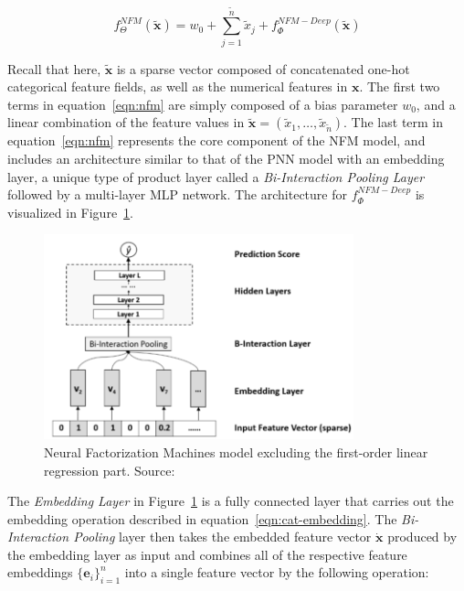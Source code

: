 \documentclass{mldsmsc}
\begin{document}
\begin{equation}
    \label{eqn:nfm}
    f_{\Theta}^{NFM}(\tilde{\mathbf{x}}) = w_0 + \sum_{j=1}^{\tilde{n}} \tilde{x}_j
    + f_{\Phi}^{NFM-Deep}(\tilde{\mathbf{x}})
\end{equation}

Recall that here, $\tilde{\mathbf{x}}$ is a sparse vector composed of concatenated one-hot
categorical feature fields, as well as the numerical features in $\mathbf{x}$.
The first two terms in equation~\ref{eqn:nfm} are simply composed of a
bias parameter $w_0$, and a linear combination of the feature values
in $\tilde{\mathbf{x}} = \left(\tilde{x}_1, \ldots, \tilde{x}_{\tilde{n}}\right)$.
The last term in equation~\ref{eqn:nfm} represents the core component of the NFM
model, and includes an architecture similar to that of the PNN model with
an embedding layer, a unique type of product layer called a \emph{Bi-Interaction Pooling Layer}
followed by a multi-layer MLP network. The architecture for $f_{\Phi}^{NFM-Deep}$
is visualized in Figure~\ref{fig:nfm}.

\begin{figure}[h]
    \centering
    \includegraphics[width=0.8\textwidth]{../figures/nfm.png}
    \caption{Neural Factorization Machines model excluding the first-order linear regression part. Source:\cite{RefWorks:he2017neural}}
    \label{fig:nfm}
\end{figure}

The \emph{Embedding Layer} in Figure~\ref{fig:nfm} is a fully connected layer that carries
out the embedding operation described in equation~\ref{eqn:cat-embedding}. The \emph{Bi-Interaction Pooling}
layer then takes the embedded feature vector $\dot{\mathbf{x}}$ produced by the embedding layer as
input and combines all of the respective feature embeddings $\{\mathbf{e}_i\}_{i=1}^{n}$ into a single feature
vector by the following operation:
\end{document}

